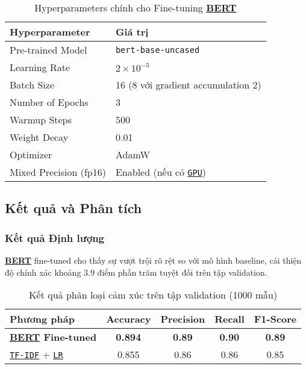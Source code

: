     \begin{table}[H]
    \centering
    \caption{Hyperparameters chính cho Fine-tuning \hyperref[acro:bert]{\textbf{BERT}}}
    \label{tab:finetuning_params_app}
    \begin{tabular}{ll}
    \toprule
    \textbf{Hyperparameter} & \textbf{Giá trị} \\
    \midrule
    Pre-trained Model & \texttt{bert-base-uncased} \\
    Learning Rate & $2 \times 10^{-5}$ \\
    Batch Size & 16 (8 với gradient accumulation 2) \\
    Number of Epochs & 3 \\
    Warmup Steps & 500 \\
    Weight Decay & 0.01 \\
    Optimizer & AdamW \\
    Mixed Precision (fp16) & Enabled (nếu có \hyperref[acro:gpu]{\texttt{GPU}}) \\
    \bottomrule
    \end{tabular}
    \end{table}
    
    \subsection{Kết quả và Phân tích}
    \label{ssec:ket_qua_phan_tich_app}
    
    \subsubsection{Kết quả Định lượng}
    \hyperref[acro:bert]{\textbf{BERT}} fine-tuned cho thấy sự vượt trội rõ rệt so với mô hình baseline, cải thiện độ chính xác khoảng 3.9 điểm phần trăm tuyệt đối trên tập validation.
    
    \begin{table}[H]
    \centering
    \caption{Kết quả phân loại cảm xúc trên tập validation (1000 mẫu)}
    \label{tab:results_summary_app}
    \begin{tabular}{lcccc}
    \toprule
    \textbf{Phương pháp} & \textbf{Accuracy} & \textbf{Precision} & \textbf{Recall} & \textbf{F1-Score} \\
    \midrule
    \textbf{\hyperref[acro:bert]{\textbf{BERT}} Fine-tuned} & \textbf{0.894} & \textbf{0.89} & \textbf{0.90} & \textbf{0.89} \\
    \hyperref[acro:tfidf]{\texttt{TF-IDF}} + \hyperref[acro:lr]{\texttt{LR}} & 0.855 & 0.86 & 0.86 & 0.85 \\
    \bottomrule
    \end{tabular}
    \end{table}
    
